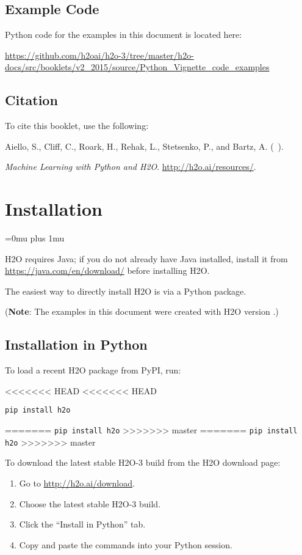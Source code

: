 \subsection{Example Code}

Python code for the examples in this document is located here:

\url{https://github.com/h2oai/h2o-3/tree/master/h2o-docs/src/booklets/v2_2015/source/Python_Vignette_code_examples}

\subsection{Citation}

To cite this booklet, use the following: 

Aiello, S., Cliff, C., Roark, H., Rehak, L., Stetsenko, P., and Bartz, A. (\shortmonthname\ \the\year). {\textit{Machine Learning with Python and H2O}. {\url{http://h2o.ai/resources/}}.


\section{Installation} 
\Urlmuskip=0mu plus 1mu\relax %

H2O requires Java; if you do not already have Java installed, install it from {\url{https://java.com/en/download/}} before installing H2O. 

The easiest way to directly install H2O is  via a Python package.

({\bf{Note}}: The examples in this document were created with H2O version \waterVersion.)

\subsection{Installation in Python}

To load a recent H2O package from PyPI, run:

<<<<<<< HEAD
<<<<<<< HEAD
\begin{lstlisting}[style=pythoncode]
pip install h2o
\end{lstlisting}
=======
{\texttt{pip install h2o}}
>>>>>>> master
=======
{\texttt{pip install h2o}}
>>>>>>> master

To download the
latest stable H2O-3 build from the H2O download page:

\begin{enumerate}
\item Go to {\url{http://h2o.ai/download}}.
\item Choose the latest stable H2O-3 build.
\item Click the ``Install in Python'' tab.
\item Copy and paste the commands into your Python session.
\end{enumerate}

}
